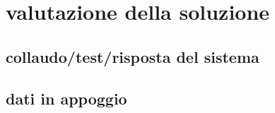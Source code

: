 \section{valutazione della soluzione}
\label{risultati}

\subsection{collaudo/test/risposta del sistema}

\subsection{dati in appoggio}

